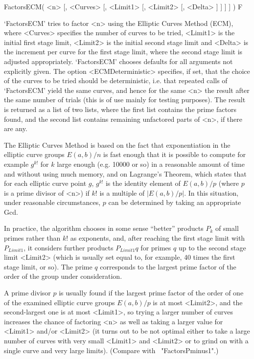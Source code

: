 

\>FactorsECM( <n> [, <Curves> [, <Limit1> [, <Limit2> [, <Delta> ] ] ] ] ) F

`FactorsECM' tries to factor <n> using the Elliptic Curves Method (ECM),
where <Curves> specifies the number of curves to be tried,
<Limit1> is the initial
first stage limit,
<Limit2> is the initial
second stage limit and
<Delta> is the increment per curve for the first stage limit, where
the second stage limit is adjusted appropriately.
`FactorsECM' chooses defaults for all arguments not explicitly given.
The option <ECMDeterministic> specifies,
if set, that the choice of the curves to be tried should be
deterministic, i.e. that repeated calls of `FactorsECM' yield
the same curves, and hence for the same <n> the result after the same
number of trials (this is of use mainly for testing purposes).
The result is returned as a list of two lists, where the first list
contains the prime factors found, and the second list contains
remaining unfactored parts of <n>, if there are any.

The Elliptic Curves Method is based on the fact that exponentiation
in the
elliptic curve groups 
$E(a,b)/n$ is fast enough
that it is possible to compute for example $g^{k!}$ for $k$ large enough 
(e.g. 10000 or so) in a reasonable amount of time and without
using much memory, and on Lagrange's Theorem, 
which states that for each
elliptic curve point $g$,
$g^{k!}$ is the identity element of $E(a,b)/p$ (where $p$ is a prime
divisor of <n>) if $k!$ is a multiple of $|E(a,b)/p|$.
In this situation, under reasonable circumstances, $p$ can be
determined by taking an appropriate Gcd.

In practice, the algorithm chooses in some sense ``better''
products $P_k$ of small primes rather than $k!$ as exponents, and,
after reaching the first stage limit with $P_{Limit1}$, it
considers further products $P_{Limit1}q$ for primes $q$ up to
the second stage limit <Limit2> (which is usually set equal to,
for example, 40 times the first stage limit, or so).
The prime $q$ corresponds to the largest prime factor of the
order of the group under consideration.

A prime divisor $p$ is usually found if the largest prime factor
of the order of one of the examined elliptic curve groups $E(a,b)/p$
is at most <Limit2>, and the second-largest one is at most <Limit1>,
so trying a larger number of curves increases the chance of
factoring <n> as well as taking a larger value
for <Limit1> and/or <Limit2> (it turns out to be not optimal either to
take a large number of curves with very small <Limit1> and <Limit2>
or to grind on with a single curve and very large limits).
(Compare with ~"FactorsPminus1".)

